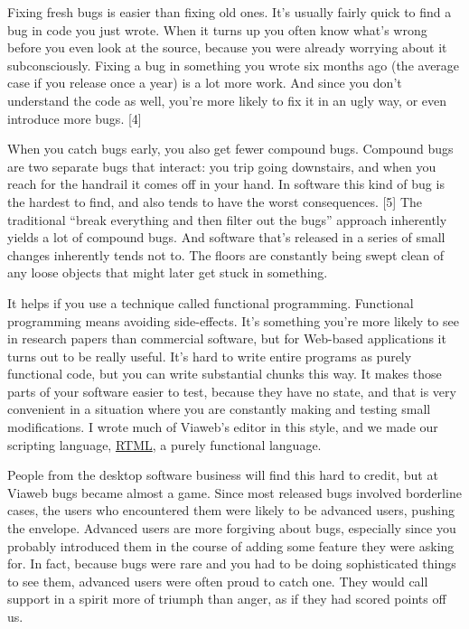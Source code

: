 Fixing fresh bugs is easier than fixing old ones. It's usually fairly
quick to find a bug in code you just wrote. When it turns up you often
know what's wrong before you even look at the source, because you were
already worrying about it subconsciously. Fixing a bug in something you
wrote six months ago (the average case if you release once a year) is a
lot more work. And since you don't understand the code as well, you're
more likely to fix it in an ugly way, or even introduce more bugs.
{[}4{]}

When you catch bugs early, you also get fewer compound bugs. Compound
bugs are two separate bugs that interact: you trip going downstairs, and
when you reach for the handrail it comes off in your hand. In software
this kind of bug is the hardest to find, and also tends to have the
worst consequences. {[}5{]} The traditional ``break everything and then
filter out the bugs'' approach inherently yields a lot of compound bugs.
And software that's released in a series of small changes inherently
tends not to. The floors are constantly being swept clean of any loose
objects that might later get stuck in something.

It helps if you use a technique called functional programming.
Functional programming means avoiding side-effects. It's something
you're more likely to see in research papers than commercial software,
but for Web-based applications it turns out to be really useful. It's
hard to write entire programs as purely functional code, but you can
write substantial chunks this way. It makes those parts of your software
easier to test, because they have no state, and that is very convenient
in a situation where you are constantly making and testing small
modifications. I wrote much of Viaweb's editor in this style, and we
made our scripting language,
\href{http://store.yahoo.com/rtml.html}{RTML}, a purely functional
language.

People from the desktop software business will find this hard to credit,
but at Viaweb bugs became almost a game. Since most released bugs
involved borderline cases, the users who encountered them were likely to
be advanced users, pushing the envelope. Advanced users are more
forgiving about bugs, especially since you probably introduced them in
the course of adding some feature they were asking for. In fact, because
bugs were rare and you had to be doing sophisticated things to see them,
advanced users were often proud to catch one. They would call support in
a spirit more of triumph than anger, as if they had scored points off
us.

